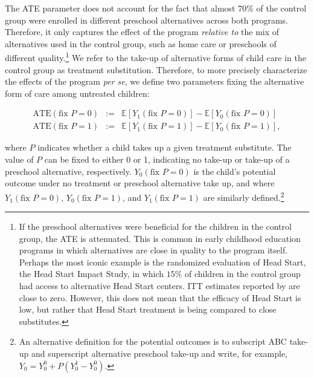 \noindent The ATE parameter does not account for the fact that almost $70 \%$ of the control group were enrolled in different preschool alternatives across both programs. Therefore, it only captures the effect of the program \emph{relative to} the mix of alternatives used in the control group, such as home care or preschools of different quality.\footnote{If the preschool alternatives were beneficial for the children in the control group, the ATE is attenuated. This is common in early childhood education programs in which alternatives are close in quality to the program itself. Perhaps the most iconic example is the randomized evaluation of Head Start, the Head Start Impact Study, in which $15\%$ of children in the control group had access to alternative Head Start centers. ITT estimates reported by \cite{Puma_Bell_etal_2010_HeadStartImpact} are close to zero. However, this does not mean that the efficacy of Head Start is low, but rather that Head Start treatment is being compared to close substitutes.} We refer to the take-up of alternative forms of child care in the control group as treatment substitution. Therefore, to more precisely characterize the effects of the program \emph{per se}, we define two parameters fixing the alternative form of care among untreated children: 

\begin{eqnarray}
\text{ATE} \left( \text{fix } P = 0 \right) &:=& \mathbb{E} \left[ Y_{1} \left( \text{fix } P = 0 \right) \right] -  \mathbb{E} \left[ Y_{0} \left( \text{fix } P = 0 \right) \right] \\
\text{ATE} \left( \text{fix } P = 1 \right) &:=& \mathbb{E} \left[ Y_{1} \left( \text{fix } P = 1 \right) \right] -  \mathbb{E} \left[ Y_{0} \left( \text{fix } P = 1 \right) \right],
\end{eqnarray}

\noindent where $P$ indicates whether a child takes up a given treatment substitute. The value of $P$ can be fixed to either $0$ or 1, indicating no take-up or take-up of a preschool alternative, respectively. $Y_{0} \left( \text{fix } P = 0 \right)$ is the child's potential outcome under no treatment or preschool alternative take up, and where $Y_{1} \left( \text{fix } P = 0 \right)$, $Y_{0} \left( \text{fix } P = 1 \right)$, and $Y_{1} \left( \text{fix } P = 1 \right) $ are similarly defined.\footnote{An alternative definition for the potential outcomes is to subscript ABC take-up and superscript alternative preschool take-up and write, for example, $Y_{0} = Y_{0}^0 + P \left( Y_{0}^1 - Y_{0}^0 \right)$.}\\

